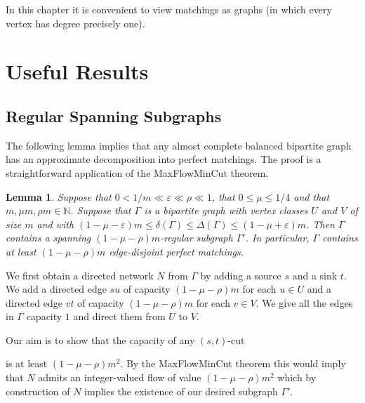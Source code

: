 \documentclass{memo-l}
\newtheorem{lemma}[firstthm]{Lemma}
\def\COMMENT#1{}
\def\proof{\removelastskip\penalty55\medskip\noindent{\bf Proof. }}
\def\eps{\varepsilon}
\numberwithin{section}{chapter}
\numberwithin{equation}{section}
\numberwithin{firstthm}{section}
\numberwithin{figure}{section}
\begin{document}
{In this chapter it is convenient to view matchings as graphs (in which every vertex has degree precisely one).





\section{Useful Results} \label{tools}

\subsection{Regular Spanning Subgraphs}
The following lemma implies that any almost complete balanced bipartite graph has an approximate decomposition into perfect matchings.
The proof is a straightforward application of the MaxFlowMinCut theorem.

\begin{lemma}\label{regularsub}
Suppose that
$0<1/m \ll \eps \ll \rho \ll 1$, that $0 \le \mu \le 1/4$ and that $m, \mu m, \rho m \in \mathbb{N}$.
Suppose that $\Gamma$ is a bipartite graph with vertex classes $U$ and $V$ of size $m$ and with
$(1-\mu-\eps)m \leq \delta (\Gamma) \leq \Delta (\Gamma) \leq (1-\mu+\eps)m$.  Then $\Gamma$ contains a spanning $(1-\mu-\rho)m$-regular subgraph
$\Gamma '$.
In particular, $\Gamma$ contains at least $(1-\mu-\rho)m$ edge-disjoint perfect matchings.
\end{lemma}
\proof 
We first obtain a directed network $N$ from $\Gamma$ by adding a source $s$ and a sink $t$.
We add a directed edge $su$ of capacity $(1-\mu-\rho)m$ for each $u \in U$ and a directed edge $vt$ of capacity 
$(1-\mu-\rho)m$ for each $v \in V$. We give all the edges in $\Gamma$ capacity $1$ and direct them from $U$ to $V$.

Our aim is to show that the capacity of any $(s,t)$-cut%
	\COMMENT{Allan: replace cut with $(s,t)$-cut.}
 is at least $(1-\mu-\rho)m^2$. By the MaxFlowMinCut theorem this would imply
that $N$ admits an integer-valued flow of value $(1-\mu-\rho)m^2$ which by construction of $N$ implies the existence of our desired subgraph $\Gamma '$.

}
\end{document}

